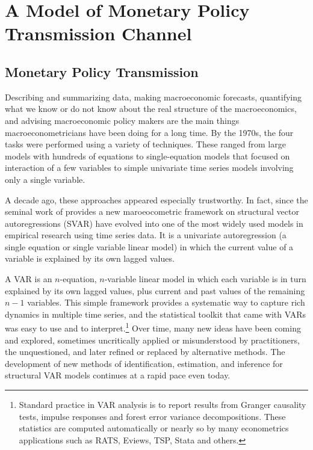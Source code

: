 \documentclass[11pt,letterpaper]{article}
\begin{document}
\section{A Model of Monetary Policy Transmission Channel}\label{sec:r1}

\subsection{Monetary Policy Transmission}
	Describing and summarizing data, making macroeconomic forecasts, quantifying what we know or do not know about the real structure of the macroeconomics, and advising macroeconomic policy makers are the main things macroeconometricians have been doing for a long time. By the 1970s, the four tasks were performed using a variety of techniques. These ranged from large models with hundreds of equations to single-equation models that focused on interaction of a few variables to simple univariate time series models involving only a single variable.  


	A decade ago, these approaches appeared especially trustworthy. In fact, since the seminal work of \citet{Sims1980} provides a new maroeocometric framework on structural vector autoregressions (SVAR) have evolved into one of the most widely used models in empirical research using time series data. It is a univariate autoregression (a single equation or single variable linear model) in which the current value of a variable is explained by its own lagged values. 

	A VAR is an $n$-equation, $n$-variable linear model in which each variable is in turn explained by its own lagged values, plus current and past values of the remaining $n - 1$ variables. This simple framework provides a systematic way to capture rich dynamics in multiple time series, and the statistical toolkit that came with VARs was easy to use and to interpret.\footnote{Standard practice in VAR analysis is to report results from Granger causality tests, impulse responses and forest error variance decompositions. These statistics are computed automatically or nearly so by many econometrics applications such as RATS, Eviews, TSP, Stata and others.} Over time, many new ideas have been coming and explored, sometimes uncritically applied or misunderstood by practitioners, the unquestioned, and later refined or replaced by alternative methods. The development of new methods of identification, estimation, and inference for structural VAR models continues at a rapid pace even today. 	
	
\end{document}
